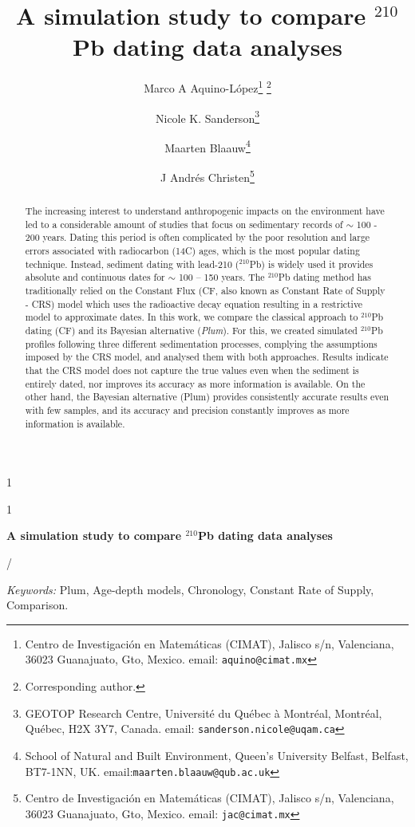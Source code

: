 \documentclass [10pt] {article}
\date{ }
\newcommand{\blind}{1}
\newcommand{\papertitle}{
 A simulation study to compare $^{210}$Pb dating data analyses 
}
\begin{document}
	\def\spacingset#1{\renewcommand{\baselinestretch}%
		{#1}\small\normalsize} \spacingset{1}
	\blind
	{
		\title{\textbf{\papertitle}}

		\author{Marco A Aquino-L\'opez\thanks{
				Centro de Investigaci\'on en Matem\'aticas (CIMAT),
				Jalisco s/n, Valenciana, 36023 Guanajuato, Gto, Mexico.
				email: \texttt{aquino@cimat.mx} } \thanks{Corresponding author.}
					\and
			Nicole K. Sanderson\thanks{
				GEOTOP Research Centre, Université du Québec à Montréal, 
				Montréal, Québec, H2X 3Y7, Canada. 
				email: \texttt{sanderson.nicole@uqam.ca}}
					\and
			Maarten Blaauw\thanks{School of Natural and Built Environment,
				Queen's University Belfast,
				Belfast, BT7-1NN, UK.
				email:\texttt{maarten.blaauw@qub.ac.uk}  }
					\and
			J Andr\'es Christen\thanks{
				Centro de Investigaci\'on en Matem\'aticas (CIMAT),
				Jalisco s/n, Valenciana, 36023 Guanajuato, Gto, Mexico.
				email: \texttt{jac@cimat.mx}  }
			}
		\maketitle
	} \fi

	\blind
	{
		\bigskip
		\bigskip
		\bigskip
		\begin{center}
			{\LARGE\bf \papertitle}
		\end{center}
		\medskip/
	} \fi

	\bigskip
\begin{abstract}
	The increasing interest to understand anthropogenic impacts on the environment have led to a considerable amount of studies that focus on sedimentary records of $\sim$ 100 - 200 years. Dating this period is often complicated by the poor resolution and large errors associated with radiocarbon (14C) ages, which is the most popular dating technique. Instead, sediment dating with lead-210 ($^210$Pb) is widely used it provides absolute and continuous dates for $\sim$ 100 – 150 years. The $^210$Pb dating method has traditionally relied on the Constant Flux (CF, also known as Constant Rate of Supply - CRS) model which uses the radioactive decay equation resulting in a restrictive model to approximate dates. In this work, we compare the classical approach to $^210$Pb dating (CF) and its Bayesian alternative (\textit{Plum}). For this, we created simulated $^210$Pb profiles following three different sedimentation processes, complying the assumptions imposed by the CRS model, and analysed them with both approaches. Results indicate that the CRS model does not capture the true values even when the sediment is entirely dated, nor improves its accuracy as more information is available. On the other hand, the Bayesian alternative (Plum) provides consistently accurate results even with few samples, and its accuracy and precision constantly improves as more information is available.
\end{abstract}
	\noindent%
	{\it Keywords:} Plum, Age-depth models, Chronology, Constant Rate of Supply, Comparison.
	\vfill
	\newpage
	\spacingset{1.45} %
\end{document}
